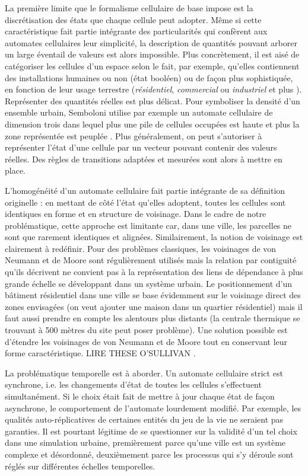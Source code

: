 \documentclass[10pt]{article}
\begin{document}
\begin{multicols}{2}
La première limite que le formalisme cellulaire de base impose est la
discrétisation des états que chaque cellule peut adopter. Même si
cette caractéristique fait partie intégrante des particularités qui
confèrent aux automates cellulaires leur simplicité, la description de
quantités pouvant arborer un large éventail de valeurs est alors
impossible. Plus concrètement, il est aisé de catégoriser les cellules
d'un espace selon le fait, par exemple, qu'elles contiennent des
installations humaines ou non (état booléen)
\cite{Benguigui2004,Cornu} ou de façon plus sophistiquée, en fonction
de leur usage terrestre (\textit{résidentiel}, \textit{commercial} ou
\textit{industriel} \cite{Lechner} et plus
\cite{Dubos-Paillard203}). Représenter des quantités réelles est plus
délicat. Pour symboliser la densité d'un ensemble urbain, Semboloni
utilise par exemple un automate cellulaire de dimension trois dans
lequel plus une pile de cellules occupées est haute et plus la zone
représentée est peuplée \cite{Semboloni2000}. Plus généralement, on
peut s'autoriser à représenter l'état d'une cellule par un vecteur
pouvant contenir des valeurs réelles. Des règles de transitions
adaptées et mesurées sont alors à mettre en place.

L'homogénéité d'un automate cellulaire fait partie intégrante de sa
définition originelle : en mettant de côté l'état qu'elles adoptent,
toutes les cellules sont identiques en forme et en structure de
voisinage. Dans le cadre de notre problématique, cette approche est
limitante car, dans une ville, les parcelles ne sont que rarement
identiques et alignées. Similairement, la notion de voisinage est
clairement à redéfinir. Pour des problèmes classiques, les voisinages
de von Neumann et de Moore sont régulièrement utilisés mais la
relation par contiguité qu'ils décrivent ne convient pas à la
représentation des liens de dépendance à plus grande échelle se
développant dans un système urbain. Le positionnement d'un bâtiment
résidentiel dans une ville se base évidemment sur le voisinage direct
des zones envisagées (on veut ajouter une maison dans un quartier
résidentiel) mais il faut aussi prendre en compte les alentours plus
distants (la centrale thermique se trouvant à 500 mètres du site peut
poser problème). Une solution possible est d'étendre les voisinages de
von Neumann et de Moore tout en conservant leur forme
caractéristique. LIRE THESE O'SULLIVAN
\cite{O'Sullivan2000,0'Sullivan2001}.

La problématique temporelle est à aborder. Un automate cellulaire
strict est synchrone, i.e. les changements d'état de toutes les
cellules s'effectuent simultanément. Si le choix était fait de mettre
à jour chaque état de façon asynchrone, le comportement de l'automate
lourdement modifié. Par exemple, les qualités auto-réplicatives de
certaines entités du jeu de la vie ne seraient pas garanties. Il est
pourtant légitime de se questionner sur la validité d'un tel choix
dans une simulation urbaine, premièrement parce qu'une ville est un
système complexe et désordonné, deuxièmement parce les processus qui
s'y déroule sont réglés sur différentes échelles temporelles.


\end{multicols}
\end{document}
